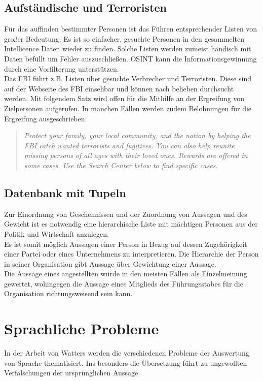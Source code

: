 \documentclass[twoside,a4paper]{article}
\begin{document}
\subsection{Aufständische und Terroristen}
Für das auffinden bestimmter Personen ist das Führen entsprechender Listen von großer Bedeutung. Es ist so einfacher, gesuchte Personen in den gesammelten Intellicence Daten wieder zu finden. Solche Listen werden zumeist händisch mit Daten befüllt um Fehler auszuschließen. OSINT kann die Informationsgewinnung durch eine Vorfilterung unterstützen.\\
Das FBI führt z.B. Listen über gesuchte Verbrecher und Terroristen. Diese sind auf der Webseite\cite{wanted} des FBI einsehbar und können nach belieben durchsucht werden. Mit folgendem Satz wird offen für die Mithilfe an der Ergreifung von Zielpersonen aufgerufen. In manchen Fällen werden zudem Belohnungen für die Ergreifung ausgeschrieben.

\begin{quote}
\textit{Protect your family, your local community, and the nation by helping the FBI catch wanted terrorists and fugitives. You can also help reunite missing persons of all ages with their loved ones. Rewards are offered in some cases. Use the Search Center below to find specific cases.}
\end{quote}


\subsection{Datenbank mit Tupeln}
Zur Einordnung von Geschehnissen und der Zuordnung von Aussagen und des Gewicht ist es notwendig eine hierarchische Liste mit mächtigen Personen aus der Politik und Wirtschaft anzulegen.\\
Es ist somit möglich Aussagen einer Person in Bezug auf dessen Zugehörigkeit einer Partei oder eines Unternehmens zu interpretieren. Die Hierarchie der Person in seiner Organisation gibt Aussage über Gewichtung einer Aussage.\\
Die Aussage eines angestellten würde in den meisten Fällen als Einzelmeinung gewertet, wohingegen die Aussage eines Mitglieds des Führungsstabes für die Organisation richtungsweisend sein kann.


\section{Sprachliche Probleme}
In der Arbeit von Watters\cite{challenges_to_automated_alloegory} werden die verschiedenen Probleme der Auswertung von Sprache thematisiert. Ins besonders die Übersetzung führt zu ungewollten Verfälschungen der ursprünglichen Aussage.
\end{document}
